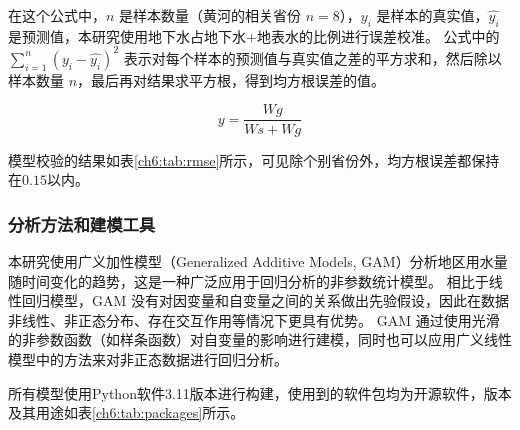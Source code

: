 在这个公式中，$n$ 是样本数量（黄河的相关省份 $n = 8$），$y_i$ 是样本的真实值，$\hat{y_i}$ 是预测值，本研究使用地下水占地下水+地表水的比例进行误差校准。
公式中的 $\sum_{i=1}^{n}{(y_i - \hat{y_i})}^2$ 表示对每个样本的预测值与真实值之差的平方求和，然后除以样本数量 $n$，最后再对结果求平方根，得到均方根误差的值。

\begin{equation}
    \label{ch6:eq:verify}
    y = \frac{Wg}{Ws + Wg}
\end{equation}

模型校验的结果如表\ref{ch6:tab:rmse}所示，可见除个别省份外，均方根误差都保持在$0.15$以内。



\subsubsection{分析方法和建模工具}

本研究使用广义加性模型（Generalized Additive Models, GAM）分析地区用水量随时间变化的趋势，这是一种广泛应用于回归分析的非参数统计模型。
相比于线性回归模型，GAM 没有对因变量和自变量之间的关系做出先验假设，因此在数据非线性、非正态分布、存在交互作用等情况下更具有优势。
GAM 通过使用光滑的非参数函数（如样条函数）对自变量的影响进行建模，同时也可以应用广义线性模型中的方法来对非正态数据进行回归分析。

所有模型使用Python软件3.11版本进行构建，使用到的软件包均为开源软件，版本及其用途如表\ref{ch6:tab:packages}所示。


